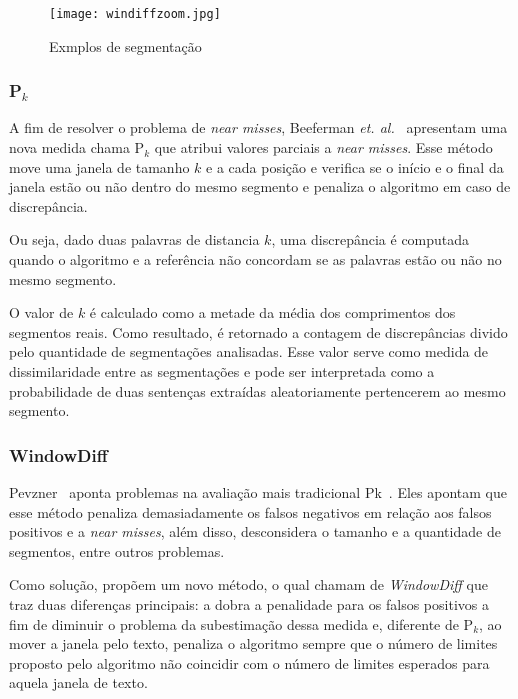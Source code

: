   \begin{figure}[!h]

	\centering
	\texttt{[image: windiffzoom.jpg]}
	\caption{Exmplos de segmentação}
	\label{fig:exemplosegmentacaozoom}

  \end{figure}



\subsubsection{P$_k$}
A fim de resolver o problema de \textit{near misses}, Beeferman \textit{et. al.}~\cite{Beeferman1999} apresentam uma nova medida chama P$_k$ que atribui valores parciais a \textit{near misses}. Esse método move uma janela de tamanho $k$ e a cada posição e verifica se o início e o final da janela estão ou não dentro do mesmo segmento e penaliza o algoritmo em caso de discrepância. 

Ou seja, dado duas palavras de distancia $k$, uma discrepância é computada quando o algoritmo e a referência não concordam se as palavras estão ou não no mesmo segmento.

O valor de $k$ é calculado como a metade da média dos comprimentos dos segmentos reais. Como resultado, é retornado a contagem de discrepâncias divido pelo quantidade de segmentações analisadas. Esse valor serve como medida de dissimilaridade entre as segmentações e pode ser interpretada como a probabilidade de duas sentenças extraídas aleatoriamente pertencerem ao mesmo segmento.



\subsubsection{WindowDiff}

Pevzner~\cite{Pevzner2002} aponta problemas na avaliação mais tradicional Pk~\cite{Beeferman1999}. Eles apontam que esse método penaliza demasiadamente os falsos negativos em relação aos falsos positivos e a \textit{near misses}, além disso, desconsidera o tamanho e a quantidade de segmentos, entre outros problemas.

Como solução, propõem um novo método, o qual chamam de \textit{WindowDiff} que traz duas diferenças principais: a dobra a penalidade para os falsos positivos a fim de diminuir o problema da subestimação dessa medida e, diferente de P$_k$, ao mover a janela pelo texto, penaliza o algoritmo sempre que o número de limites proposto pelo algoritmo não coincidir com o número de limites esperados para aquela janela de texto. 

